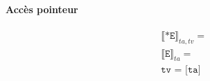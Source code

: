 \documentclass[12pt,twocolumn]{report}
\begin{document}
\begin{trad}
    \paragraph*{Accès pointeur}
    \begin{align*}
        &\llbracket \texttt{*E} \rrbracket_{ta,tv}= \\
        &\llbracket \texttt{E} \rrbracket_{ta}= \\
        &\texttt{tv = [ta]} 
    \end{align*}
\end{trad}
\end{document}
